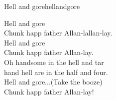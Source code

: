 \begin{song}{Hell and gore}{hellandgore}
\begin{vers}
Hell and gore\\
Chunk happ father Allan-lallan-lay.\\
Hell and gore\\
Chunk happ father Allan-lay.\\
Oh handsome in the hell and tar\\
hand hell are in the half and four.\\
Hell and gore...(Take the booze)\\
Chunk happ father Allan-lay!\\
\end{vers}
\end{song}
